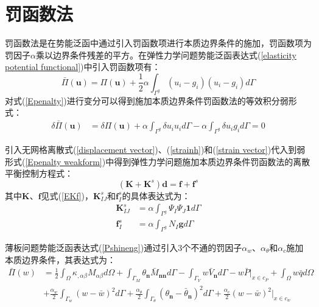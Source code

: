 \section{罚函数法}
罚函数法\cite{}是在势能泛函中通过引入罚函数项进行本质边界条件的施加，罚函数项为罚因子$\alpha$乘以边界条件残差的平方。在弹性力学问题势能泛函表达式(\ref{elasticity potential functional})中引入罚函数项有：
\begin{equation}\label{Epenalty}
    \bar{\Pi}(\pmb{u})=\Pi(\pmb{u})+\frac{1}{2}\alpha\int_{\Gamma^g}(u_i-g_i)(u_i-g_i)d\Gamma
\end{equation}
对式(\ref{Epenalty})进行变分可以得到施加本质边界条件罚函数法的等效积分弱形式：
\begin{equation}\label{Epenalty weakform}
\begin{split}
    \delta\bar{\Pi}(\pmb{u})&=\delta\Pi(\pmb{u})+\alpha\int_{\Gamma^g}\delta u_iu_id\Gamma-\alpha\int_{\Gamma^g}\delta u_ig_id\Gamma
    =0
\end{split}                                                 
\end{equation}\par
引入无网格离散式(\ref{displacement vector})、(\ref{strainh})和(\ref{strain vector})代入到弱形式(\ref{Epenalty weakform})中得到弹性力学问题施加本质边界条件罚函数法的离散平衡控制方程式：
\begin{equation}
    (\pmb{K}+\pmb{K}^s)\pmb{d}=\pmb{f}+\pmb{f}^s
\end{equation}
其中$\pmb{K}$、$\pmb{f}$见式(\ref{EKf})，$\pmb K^s_{I\!J}$和$\pmb f^s_I$的具体表达式为：
\begin{align}
  \pmb K^s_{I\!J}&=\alpha\int_{\Gamma^g}\Psi_I\Psi_J\boldsymbol 1d\Gamma\\
  \pmb f^s_I&=\alpha\int_{\Gamma^g}N_I\pmb{g}d\Gamma
\end{align}\par
薄板问题势能泛函表达式(\ref{Pshineng})通过引入3个不通的罚因子$\alpha_w$、$\alpha_\theta$和$\alpha_c$施加本质边界条件，其表达式为：
\begin{equation}\label{Ppenalty}
\begin{split}
        \bar{\Pi}(w)&=\frac{1}{2}\int_{\Omega}\kappa_{,\alpha\beta}M_{\alpha\beta}d\Omega+\int_{\Gamma_M}\theta_{\pmb{n}}\bar{M}_{\pmb{nn}}d\Gamma-\int_{\Gamma_V}w\bar{V}_{\pmb{n}}d\Gamma-w\bar{P}\vert_{x\in c_P}+\int_{\Omega}w\bar{q}d\Omega\\
    &+\frac{\alpha_w}{2}\int_{\Gamma_w}(w-\bar{w})^2d\Gamma+\frac{\alpha_{\theta}}{2}\int_{\Gamma_{\theta}}(\theta_{\pmb{n}}-\bar{\theta}_{\pmb{n}})^2d\Gamma+\frac{\alpha_c}{2}(w-\bar{w})^2\vert_{x\in c_w}
\end{split}
\end{equation}
